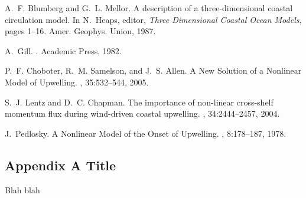 \documentclass[10pt]{ucthesis}
\begin{document}
\begin{thebibliography}{9}


A.~F. Blumberg and G.~L. Mellor.
\newblock A description of a three-dimensional coastal circulation model.
\newblock In N.~Heaps, editor, {\em Three Dimensional Coastal Ocean Models},
  pages 1--16. Amer. Geophys. Union, 1987.

A.~Gill.
.
\newblock Academic Press, 1982.

P.~F. Choboter, R.~M. Samelson, and J.~S. Allen.
\newblock A {N}ew {S}olution of a {N}onlinear {M}odel of {U}pwelling.
, 35:532--544, 2005.

S.~J. Lentz and D.~C. Chapman.
\newblock The importance of non-linear cross-shelf momentum flux during
  wind-driven coastal upwelling.
, 34:2444--2457, 2004.

J.~Pedlosky.
\newblock A {N}onlinear {M}odel of the {O}nset of {U}pwelling.
, 8:178--187, 1978.

\end{thebibliography}


\makeatletter
{}
\makeatother


\begin{appendices}
\chapter{Appendix A Title} \label{Appendix A}

Blah blah

\end{appendices}


\end{document}
